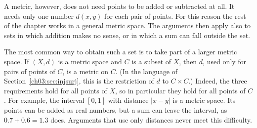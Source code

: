 A metric, however, does not need points to be added or subtracted at all. It needs only one number $d(x,y)$ for each pair of points. For this reason the rest of the chapter works in a general metric space. The arguments then apply also to sets in which addition makes no sense, or in which a sum can fall outside the set.

The most common way to obtain such a set is to take part of a larger metric space. If $(X,d)$ is a metric space and $C$ is a subset of $X$, then $d$, used only for pairs of points of $C$, is a metric on $C$. (In the language of Section~\ref{ch03:sec:injsurj}, this is the restriction of $d$ to $C\times C$.) Indeed, the three requirements hold for all points of $X$, so in particular they hold for all points of $C$. For example, the interval $[0,1]$ with distance $|x-y|$ is a metric space. Its points can be added as real numbers, but a sum can leave the interval, as $0.7+0.6=1.3$ does. Arguments that use only distances never meet this difficulty.
